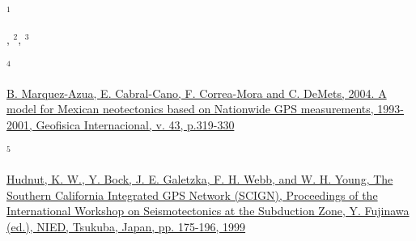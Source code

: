 \documentclass[times,twocolumn,final,authoryear]{elsarticle}
\begin{document}
\begin{landscape}
\begin{minipage}{0.9\linewidth}
      \hypertarget{Hudnut}{${}^1$}\citet{Hudnut:2002},
      \hypertarget{Garnier}{${}^2$}\citet{Garnier:2021}, 
      \hypertarget{Graham}{${}^3$}\citet{Graham:2016}
      
      \hypertarget{Marquez}{${}^4$}\href{https://doi.org/10.7283/T58S4N9N}{B. Marquez-Azua, E. Cabral-Cano, F. Correa-Mora and C. DeMets, 2004. A model for Mexican neotectonics based on Nationwide GPS measurements, 1993-2001, Geofisica Internacional, v. 43, p.319-330}
      
      \hypertarget{Hudnut2}{${}^5$}\href{https://doi.org/10.7283/T5668BHN}{Hudnut, K. W., Y. Bock, J. E. Galetzka, F. H. Webb, and W. H. Young, The Southern California Integrated GPS Network (SCIGN), Proceedings of the International Workshop on Seismotectonics at the Subduction Zone, Y. Fujinawa (ed.), NIED, Tsukuba, Japan, pp. 175-196, 1999}
    
    
    
    \end{minipage}
  \end{landscape}
  \clearpage
  \twocolumn
     
     
\end{document}
